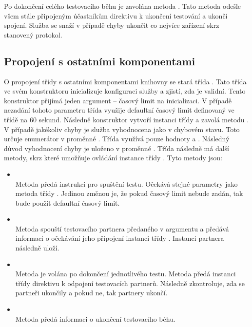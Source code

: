 Po dokončení celého testovacího běhu je zavolána metoda . Tato metoda odešle všem stále připojeným účastníkům direktivu k ukončení testování a ukončí spojení. Služba se snaží v případě chyby ukončit co nejvíce zařízení skrz stanovený protokol.

\subsection{Propojení s ostatními komponentami}

O propojení třídy  s ostatními komponentami knihovny se stará třída .
Tato třída ve svém konstruktoru inicializuje konfiguraci služby a zjistí, zda je validní. Tento konstruktor přijímá jeden argument -- časový limit na inicializaci. V případě nezadání tohoto parametru třída využije defaultní časový limit definovaný ve třídě na 60 sekund. Následně konstruktor vytvoří instanci třídy  a zavolá metodu . V případě jakékoliv chyby je služba vyhodnocena jako v chybovém stavu. Toto určuje enumerátor  v proměnné . Třída využívá pouze hodnoty  a . Následný důvod vyhodnocení chyby je uloženo v proměnné . Třída následně má další metody, skrz které umožňuje ovládání instance třídy . Tyto metody jsou:

\begin{itemize}
    \item {} \\ Metoda předá instrukci pro spuštění testu. Očekává stejné parametry jako metoda  třídy . Jedinou změnou je, že pokud časový limit nebude zadán, tak bude použit defaultní časový limit.
    \item {} \\ Metoda spouští testovacího partnera předaného v argumentu a předává informaci o očekávání jeho připojení  instanci třídy . Instanci partnera následně uloží.
    \item {} \\ Metoda je volána po dokončení jednotlivého testu. Metoda předá instanci třídy  direktivu k odpojení testovacích partnerů. Následně zkontroluje, zda se partneři ukončily a pokud ne, tak partnery ukončí.
    \item {} \\ Metoda předá informaci o ukončení testovacího běhu.
\end{itemize}


